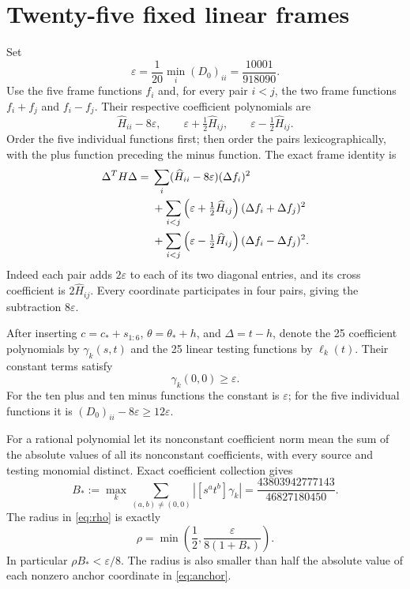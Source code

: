 \documentclass[11pt]{article}
\newcommand{\eps}{\varepsilon}
\theoremstyle{definition}
\begin{document}
\section{Twenty-five fixed linear frames}

Set
\begin{equation}
 \eps=\frac1{20}\min_i(D_0)_{ii}=\frac{10001}{918090}.
 \label{eq:eps}
\end{equation}
Use the five frame functions $f_i$ and, for every pair $i<j$, the two frame
functions $f_i+f_j$ and $f_i-f_j$. Their respective coefficient polynomials
are
\begin{equation}
 \widehat H_{ii}-8\eps,\qquad
 \eps+\tfrac12\widehat H_{ij},\qquad
 \eps-\tfrac12\widehat H_{ij}.
 \label{eq:coefficients}
\end{equation}
Order the five individual functions first; then order the pairs
lexicographically, with the plus function preceding the minus function.
The exact frame identity is
\begin{align}
 \Delta^TH\Delta={}&
 \sum_i(\widehat H_{ii}-8\eps)(\Delta f_i)^2\notag\\
 &+\sum_{i<j}\left(\eps+\tfrac12\widehat H_{ij}\right)
                   (\Delta f_i+\Delta f_j)^2\notag\\
 &+\sum_{i<j}\left(\eps-\tfrac12\widehat H_{ij}\right)
                   (\Delta f_i-\Delta f_j)^2.
 \label{eq:frame}
\end{align}
Indeed each pair adds $2\eps$ to each of its two diagonal entries, and its
cross coefficient is $2\widehat H_{ij}$. Every coordinate participates in
four pairs, giving the subtraction $8\eps$.

After inserting $c=c_*+s_{1:6}$, $\theta=\theta_*+h$, and $\Delta=t-h$, denote
the 25 coefficient polynomials by $\gamma_k(s,t)$ and the 25 linear testing
functions by $\ell_k(t)$. Their constant terms satisfy
\begin{equation}
 \gamma_k(0,0)\geq\eps.
 \label{eq:constantpositive}
\end{equation}
For the ten plus and ten minus functions the constant is $\eps$; for the
five individual functions it is $(D_0)_{ii}-8\eps\geq12\eps$.

For a rational polynomial let its nonconstant coefficient norm mean the sum
of the absolute values of all its nonconstant coefficients, with every
source and testing monomial distinct. Exact coefficient collection gives
\begin{equation}
 B_*:=\max_k\sum_{(a,b)\ne(0,0)}|[s^at^b]\gamma_k|
   =\frac{43803942777143}{46827180450}.
 \label{eq:B}
\end{equation}
The radius in \eqref{eq:rho} is exactly
\begin{equation}
 \rho=\min\left(\frac12,\frac{\eps}{8(1+B_*)}\right).
 \label{eq:radiusformula}
\end{equation}
In particular $\rho B_*<\eps/8$. The radius is also smaller than half the
absolute value of each nonzero anchor coordinate in \eqref{eq:anchor}.
\end{document}
